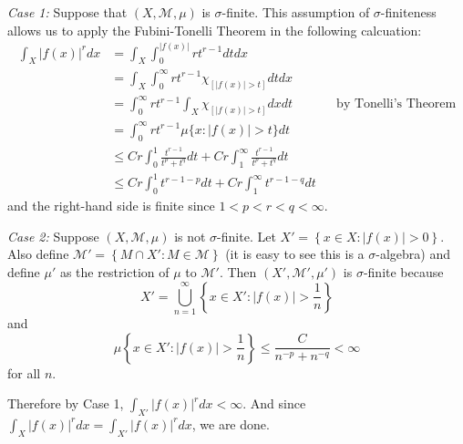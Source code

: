 \documentclass[answers]{exam}
\theoremstyle{problemstyle}
\newcommand{\vt}{\vskip 5mm} %
\newcommand{\1}[1]{\textbf{1}_{\left[#1\right]}} %
\begin{document}
\begin{questions}
\begin{solution}
  \textit{Case 1:} Suppose that $(X,\mathcal{M},\mu)$ is $\sigma$-finite. This assumption of $\sigma$-finiteness allows us to apply the Fubini-Tonelli Theorem in the following calcuation:
  \begin{align*}
    \int_{X}|f(x)|^{r}dx
    &= \int_{X} \int_{0}^{|f(x)|}r t^{r-1}dt dx\\
    &=\int_{X} \int_{0}^{\infty}  rt^{r-1}\chi_{[ |f(x)|>t]}dtdx \\
    &=\int_{0}^{\infty}r t^{r-1}\int_{X} \chi_{[ |f(x)|>t]}dxdt &&\text{by Tonelli's Theorem}\\
    &=\int_{0}^{\infty}r t^{r-1}\mu\{x: |f(x)|>t\}dt\\ 
    &\leq Cr\int_{0}^{1}\frac{t^{r-1}}{t^{p}+t^{q}}dt + Cr\int_{1}^{\infty} \frac{t^{r-1}}{t^{p}+t^{q}}dt\\ 
    &\leq Cr\int_{0}^{1}t^{r-1-p}dt + Cr\int_{1}^{\infty} t^{r-1-q}dt
  \end{align*}
  and the right-hand side is finite since $1<p<r<q<\infty$.
  
  \vt
  \textit{Case 2:} Suppose $(X,\mathcal{M},\mu)$ is not $\sigma$-finite. Let $X'= \left\{ x\in X: |f(x)|>0 \right\}$. Also define $\mathcal{M}'=\left\{ M\cap X' : M\in \mathcal{M} \right\}$ (it is easy to see this is a $\sigma$-algebra) and define $\mu'$ as the restriction of $\mu$ to $\mathcal{M}'$. Then $(X',\mathcal{M}',\mu')$ is $\sigma$-finite because
  \begin{equation*}
    X'= \bigcup_{n=1}^{\infty}\left\{ x\in X': |f(x)|>\frac{1}{n} \right\}
  \end{equation*}
  and 
  \begin{equation*}
    \mu\left\{ x\in X': |f(x)|>\frac{1}{n} \right\} \leq \frac{C}{n^{-p}+n^{-q}}<\infty
  \end{equation*}
  for all $n$.

  Therefore by Case 1, $\int_{X'}|f(x)|^{r}dx<\infty$. And since $\int_{X}|f(x)|^{r}dx = \int_{X'}|f(x)|^{r}dx$, we are done. 
  \end{solution}


\end{questions}
\end{document}
